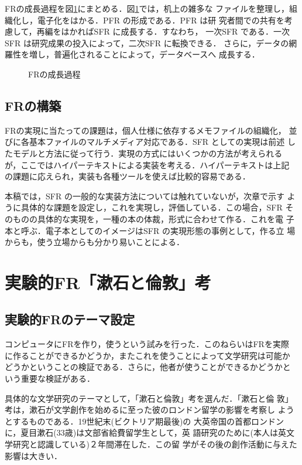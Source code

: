 FRの成長過程を図\ref{fig:4}にまとめる．図\ref{fig:4}では，机上の雑多な
ファイルを整理し，組織化し，電子化をはかる．PFR の形成である．PFR は研
究者間での共有を考慮して，再編をはかればSFR に成長する．すなわち，
一次SFR である．一次SFR は研究成果の投入によって，二次SFR に転換できる．
さらに，データの網羅性を増し，普遍化されることによって，データベースへ
成長する．

\begin{figure}[htb]
\begin{center}
  
  \caption{FRの成長過程}\label{fig:4}
\end{center}
\end{figure}

\subsection{FRの構築}
FRの実現に当たっての課題は，個人仕様に依存するメモファイルの組織化，
並びに各基本ファイルのマルチメディア対応である．SFR としての実現は前述
したモデルと方法に従って行う．実現の方式にはいくつかの方法が考えられる
が，ここではハイパーテキストによる実装を考える．ハイパーテキストは上記
の課題に応えられ，実装も各種ツールを使えば比較的容易である．

本稿では，SFR の一般的な実装方法については触れていないが，次章で示す
ように具体的な課題を設定し，これを実現し，評価している．この場合，SFR 
そのものの具体的な実現を，一種の本の体裁，形式に合わせて作る．これを電
子本と呼ぶ．電子本としてのイメージはSFR の実現形態の事例として，作る立
場からも，使う立場からも分かり易いことによる．
             
\section{実験的FR「漱石と倫敦」考}

\subsection{実験的FRのテーマ設定}
コンピュータにFRを作り，使うという試みを行った．このねらいはFRを実際
に作ることができるかどうか，またこれを使うことによって文学研究は可能か
どうかということの検証である．さらに，他者が使うことができるかどうかと
いう重要な検証がある．

具体的な文学研究のテーマとして，「漱石と倫敦」考を選んだ．「漱石と倫
敦」考は，漱石が文学創作を始めるに至った彼のロンドン留学の影響を考察し
ようとするものである\cite{Inagaki1988}．19世紀末(ビクトリア期最後)の
大英帝国の首都ロンドンに，夏目漱石(33歳)は文部省給費留学生として，英
語研究のために(本人は英文学研究と認識している)２年間滞在した．この留
学がその後の創作活動に与えた影響は大きい\cite{Deguchi1991}．

